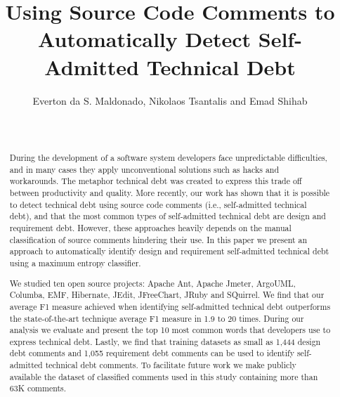 \documentclass{sig-alternate}
\newcommand{\SATD}{self-admitted technical debt\xspace}
\begin{document}

\title{Using Source Code Comments to Automatically Detect Self-Admitted Technical Debt}

\author{
\alignauthor 
       Everton da S. Maldonado, Nikolaos Tsantalis and Emad Shihab\\
       \\
       \\
}

\maketitle
\begin{abstract}
During the development of a software system developers face unpredictable difficulties, and in many cases they apply unconventional solutions such as hacks and workarounds. The metaphor technical debt was created to express this trade off between productivity and quality. More recently, our work has shown that it is possible to detect technical debt using source code comments (i.e., self-admitted technical debt), and that the most common types of self-admitted technical debt are design and requirement debt. However, these approaches heavily depends on the manual classification of source comments hindering their use. In this paper we present an approach to automatically identify design and requirement \SATD using a maximum entropy classifier. 

We studied ten open source projects: Apache Ant, Apache Jmeter, ArgoUML, Columba, EMF, Hibernate, JEdit, JFreeChart, JRuby and SQuirrel. We find that our average F1 measure achieved when identifying \SATD outperforms the state-of-the-art technique average F1 measure in 1.9 to 20 times. During our analysis we evaluate and present the top 10 most common words that developers use to express technical debt. Lastly, we find that training datasets as small as 1,444 design debt comments and 1,055 requirement debt comments can be used to identify \SATD comments. To facilitate future work we make publicly available the dataset of classified comments used in this study containing more than 63K comments. 

\end{abstract}
\end{document}
